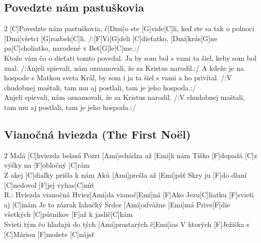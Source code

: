 \documentclass[12pt]{article}
\begin{document}
\subsection{Povedzte nám pastuškovia}
\begin{multicols}{2}
	[C]Povedzte nám pastuškovia, č[Dmi]o ste [G]vide[C]li,
	keď ste sa tak o polnoci [Dmi]všetci [G]rozbeh[C]li.
	/:[F]Vi[G]deli [C]dieťatko, [Dmi]krás[G]ne pa[C]choliatko,
	narodené v Bet[G]le[C]me.:/
	\\
	Ktože vám čo o dieťati tomto povedal.
	Ja by som bol s vami ta šiel, 
	keby som bol znal.
	/:Anjeli spievali, nám oznamovali,
	že sa Kristus narodil.:/
	\columnbreak
	A kdeže je na hospode s Matkou sveta Kráľ,
	by som i ja ta šiel s vami a ho privítal.
	/:V chudobnej maštali, tam mu aj postlali,
	tam je jeho hospoda.:/
	\\
	Anjeli spievali, nám oznamovali,
	že sa Kristus narodil.
	/:V chudobnej maštali, tam mu aj postlali,
	tam je jeho hospoda.:/
\end{multicols}

\subsection{Vianočná hviezda (The First Noël)}
\begin{multicols}{2}
	Malá [C]hviezda belasá
	Pozri [Ami]schádza až [Emi]k nám
	Tíško [F]dopadá [C]z výšky na [F]obločný [C]rám
	\\
	Z akej [C]diaľky prišla k nám
	Akú [Ami]prešla až [Emi]púť
	Skry ju [F]do dlaní [C]nedovoľ [F]jej vyhas[C]núť
	\\
	R.: Hviezda vianočná
	Hviez[Ami]da vianoč[Emi]ná
	[F]Ako Jezu[C]liatku [F]svieti aj [C]inám
	\columnbreak
	[C]Je to zázrak ľahučký
	Srdce [Ami]odvážne [Emi]má
	Prive[F]die všetkých [C]pútnikov [F]až k jaslič[C]kám
	\\
	Svieti tým čo hľadajú
	do tých [Ami]prastarých č[Emi]ias
	V ktorých [F]Ježiška s [C]Máriou [F]možete [C]nájsť
\end{multicols}
\end{document}
